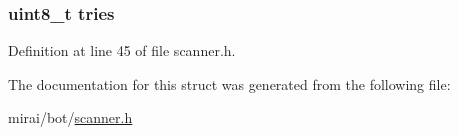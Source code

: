 \subsubsection[{\texorpdfstring{tries}{tries}}]{\setlength{\rightskip}{0pt plus 5cm}uint8\+\_\+t tries}\hypertarget{structscanner__connection_a5522305c1de4f07a6c6feb7275863f8f}{}\label{structscanner__connection_a5522305c1de4f07a6c6feb7275863f8f}


Definition at line 45 of file scanner.\+h.



The documentation for this struct was generated from the following file\+:\begin{DoxyCompactItemize}
\item 
mirai/bot/\hyperlink{scanner_8h}{scanner.\+h}\end{DoxyCompactItemize}
